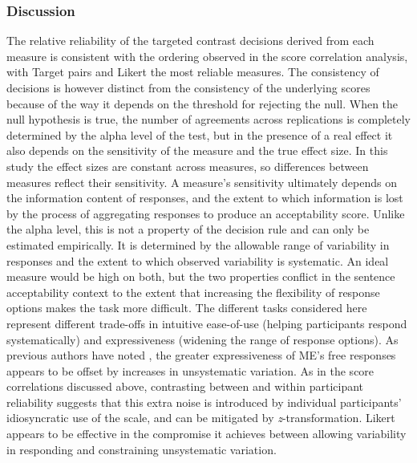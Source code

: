 \documentclass[doc]{apa6}
\newcommand{\targchoice}{{\sc Target pairs}}
\newcommand{\ME}{{\sc ME}}%
\newcommand{\likert}{{\sc Likert}}
\begin{document}
\subsubsection{Discussion}

The relative reliability of the targeted contrast decisions derived from each measure is consistent with the ordering observed in the score correlation analysis, with \targchoice{} and \likert{} the most reliable measures. The consistency of decisions is however distinct from the consistency of the underlying scores because of the way it depends on the threshold for rejecting the null. When the null hypothesis is true, the number of agreements across replications is completely determined by the alpha level of the test, but in the presence of a real effect it also depends on the sensitivity of the measure and the true effect size. In this study the effect sizes are constant across measures, so differences between measures reflect their sensitivity.
A measure's sensitivity ultimately depends on the information content of responses, and the extent to which information is lost by the process of aggregating responses to produce an acceptability score. Unlike the alpha level, this is not a property of the decision rule and can only be estimated empirically. It is determined by the allowable range of variability in responses and the extent to which observed variability is systematic. An ideal measure would be high on both, but the two properties conflict in the sentence acceptability context to the extent that increasing the flexibility of response options makes the task more difficult. The different tasks considered here represent different trade-offs in intuitive ease-of-use (helping participants respond systematically) and expressiveness (widening the range of response options). As previous authors have noted \citep{fukuda2012ismagestworththetrouble,weskott2008varinfodiffmeasures}, the greater expressiveness of {\ME}'s free responses appears to be offset by increases in unsystematic variation. As in the score correlations discussed above, contrasting between and within participant reliability suggests that this extra noise is introduced by individual participants' idiosyncratic use of the scale, and can be mitigated by {\it z}-transformation. \likert{} appears to be effective in the compromise it achieves between allowing variability in responding and constraining unsystematic variation.
\end{document}
